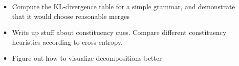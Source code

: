 
\begin{itemize}

\item Compute the KL-divergence table for a simple grammar, and
  demonstrate that it would choose reasonable merges

\item Write up stuff about constituency cues. Compare different
  constituency heuristics according to cross-entropy.

\item Figure out how to visualize decompositions better

\end{itemize}

